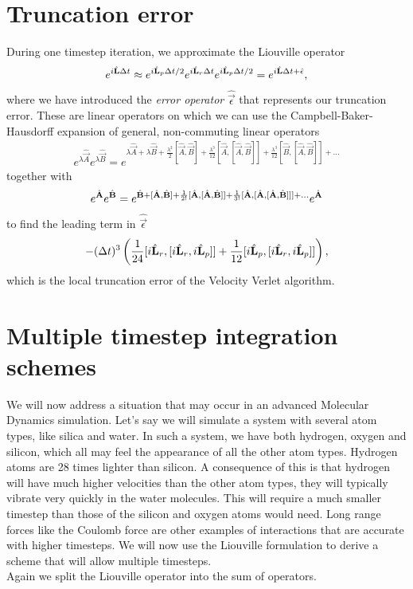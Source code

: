 \section{Truncation error}
\label{sec:velocity_verlet_error}
During one timestep iteration, we approximate the Liouville operator
\begin{align}
	e^{i\hat{\mathbf L} \Delta t} \approx e^{i\hat{\mathbf L}_p \Delta t/2}e^{i\hat{\mathbf L}_r \Delta t}e^{i\hat{\mathbf L}_p \Delta t/2} = e^{i\hat{\mathbf L} \Delta t + \hat{\mathbf \epsilon}},
\end{align}
where we have introduced the \textit{error operator} $\hat{\vec \epsilon}$ that represents our truncation error. These are linear operators on which we can use the Campbell-Baker-Hausdorff expansion of general, non-commuting linear operators
\begin{align}
	e^{\lambda\hat{\vec A}}e^{\lambda\hat{\vec B}} = e^{\lambda\hat{\vec A} + \lambda\hat{\vec B} + \frac{\lambda^2}{2}[\hat{\vec A},\hat{\vec B}] + \frac{\lambda^3}{12}[\hat{\vec A},[\hat{\vec A},\hat{\vec B}]] + \frac{\lambda^3}{12}[\hat{\vec B},[\hat{\vec A},\hat{\vec B}]] + ...}
\end{align}
together with 
\begin{align}
	e^{\hat{\mathbf{A}}}e^{\hat{\mathbf{B}}} = e^{\hat{\mathbf{B}} + [\hat{\mathbf{A}},\hat{\mathbf{B}}] + \frac{1}{2!}[\hat{\mathbf{A}},[\hat{\mathbf{A}},\hat{\mathbf{B}}]] + \frac{1}{3!}[\hat{\mathbf{A}},[\hat{\mathbf{A}},[\hat{\mathbf{A}},\hat{\mathbf{B}}]]] + ...}e^{\hat{\mathbf{A}}}
\end{align}
to find the leading term in $\hat{\vec \epsilon}$
\begin{align}
	-(\Delta t)^3\left(\frac{1}{24}[i\hat{\mathbf L}_r, [i\hat{\mathbf L}_r, i\hat{\mathbf L}_p]] + \frac{1}{12}[i\hat{\mathbf L}_p, [i\hat{\mathbf L}_r, i\hat{\mathbf L}_p]]\right),
\end{align}
which is the local truncation error of the Velocity Verlet algorithm. 
\section{Multiple timestep integration schemes}
\label{sec:multiple_timestep_schemes}
We will now address a situation that may occur in an advanced Molecular Dynamics simulation. Let's say we will simulate a system with several atom types, like silica and water. In such a system, we have both hydrogen, oxygen and silicon, which all may feel the appearance of all the other atom types. Hydrogen atoms are 28 times lighter than silicon. A consequence of this is that hydrogen will have much higher velocities than the other atom types, they will typically vibrate very quickly in the water molecules. This will require a much smaller timestep than those of the silicon and oxygen atoms would need. Long range forces like the Coulomb force are other examples of interactions that are accurate with higher timesteps. We will now use the Liouville formulation to derive a scheme that will allow multiple timesteps.\\
Again we split the Liouville operator into the sum of operators. 